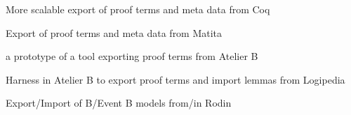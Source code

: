 \begin{workpackage}
\begin{wpdelivs}
  \begin{wpdeliv}[due=24,id=coq2,dissem=PU,nature=DEM,lead=Bol]{More scalable export of proof terms and meta data from Coq}
  \end{wpdeliv}

  \begin{wpdeliv}[due=12,id=matita1,dissem=PU,nature=DEM,lead=Bol]{Export of proof terms and meta data from Matita}
  \end{wpdeliv}

  \begin{wpdeliv}[due=24,id=atelier-b,dissem=PU,nature=DEM,lead=Cle]{a prototype of a tool exporting proof terms from Atelier B}
  \end{wpdeliv}

  \begin{wpdeliv}[due=48,id=atelier-b,dissem=PU,nature=DEM,lead=Cle]{Harness in Atelier B to export proof terms and import lemmas from Logipedia}
  \end{wpdeliv}

  \begin{wpdeliv}[due=48,id=atelier-b,dissem=PU,nature=DEM,lead=Tou]{Export/Import of B/Event B models from/in Rodin}
  \end{wpdeliv}

\end{wpdelivs}

\end{workpackage}

